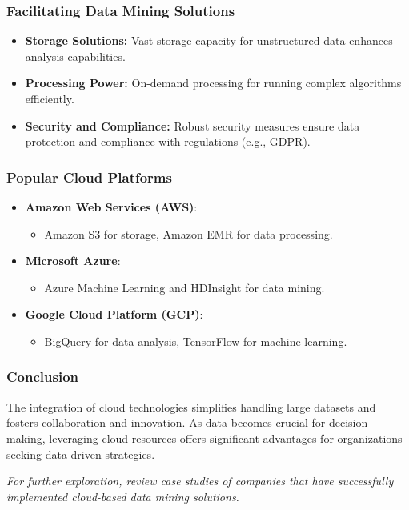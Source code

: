 \documentclass{beamer}
\begin{document}
\begin{frame}[fragile]
    \frametitle{Facilitating Data Mining Solutions}
    \begin{itemize}
        \item \textbf{Storage Solutions:} Vast storage capacity for unstructured data enhances analysis capabilities.
        \item \textbf{Processing Power:} On-demand processing for running complex algorithms efficiently.
        \item \textbf{Security and Compliance:} Robust security measures ensure data protection and compliance with regulations (e.g., GDPR).
    \end{itemize}
\end{frame}

\begin{frame}[fragile]
    \frametitle{Popular Cloud Platforms}
    \begin{itemize}
        \item \textbf{Amazon Web Services (AWS)}: 
            \begin{itemize}
                \item Amazon S3 for storage, Amazon EMR for data processing.
            \end{itemize}
        
        \item \textbf{Microsoft Azure}: 
            \begin{itemize}
                \item Azure Machine Learning and HDInsight for data mining.
            \end{itemize}
        
        \item \textbf{Google Cloud Platform (GCP)}: 
            \begin{itemize}
                \item BigQuery for data analysis, TensorFlow for machine learning.
            \end{itemize}
    \end{itemize}
\end{frame}

\begin{frame}[fragile]
    \frametitle{Conclusion}
    The integration of cloud technologies simplifies handling large datasets and fosters collaboration and innovation. As data becomes crucial for decision-making, leveraging cloud resources offers significant advantages for organizations seeking data-driven strategies.

    \textit{For further exploration, review case studies of companies that have successfully implemented cloud-based data mining solutions.}
\end{frame}
\end{document}
